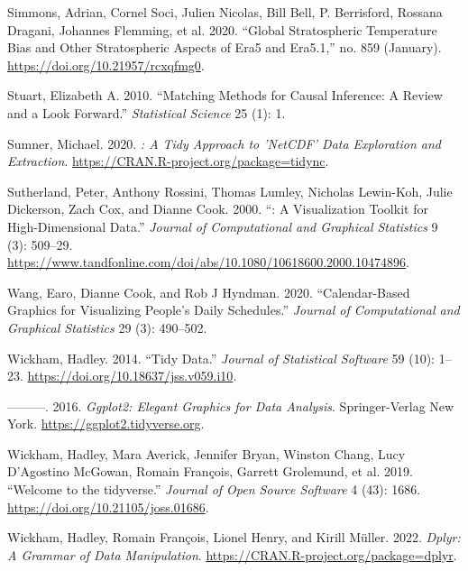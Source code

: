 \documentclass{article}
\newlength{\cslhangindent}
\newlength{\cslentryspacingunit} %
\newenvironment{CSLReferences}[2] %
 {%
  \setlength{\parindent}{0pt}
  \ifodd #1
  \let\oldpar\par
  \def\par{\hangindent=\cslhangindent\oldpar}
  \fi
  \setlength{\parskip}{#2\cslentryspacingunit}
 }%
 {}
\begin{document}
\begin{CSLReferences}{1}{0}
\leavevmode{}%
Simmons, Adrian, Cornel Soci, Julien Nicolas, Bill Bell, P. Berrisford, Rossana Dragani, Johannes Flemming, et al. 2020. {``Global Stratospheric Temperature Bias and Other Stratospheric Aspects of Era5 and Era5.1,''} no. 859 (January). \url{https://doi.org/10.21957/rcxqfmg0}.

\leavevmode{}%
Stuart, Elizabeth A. 2010. {``Matching Methods for Causal Inference: A Review and a Look Forward.''} \emph{Statistical Science} 25 (1): 1.

\leavevmode{}%
Sumner, Michael. 2020. \emph{: A Tidy Approach to 'NetCDF' Data Exploration and Extraction}. \url{https://CRAN.R-project.org/package=tidync}.

\leavevmode{}%
Sutherland, Peter, Anthony Rossini, Thomas Lumley, Nicholas Lewin-Koh, Julie Dickerson, Zach Cox, and Dianne Cook. 2000. {``: A Visualization Toolkit for High-Dimensional Data.''} \emph{Journal of Computational and Graphical Statistics} 9 (3): 509--29. \url{https://www.tandfonline.com/doi/abs/10.1080/10618600.2000.10474896}.

\leavevmode{}%
Wang, Earo, Dianne Cook, and Rob J Hyndman. 2020. {``Calendar-Based Graphics for Visualizing People's Daily Schedules.''} \emph{Journal of Computational and Graphical Statistics} 29 (3): 490--502.

\leavevmode{}%
Wickham, Hadley. 2014. {``Tidy Data.''} \emph{Journal of Statistical Software} 59 (10): 1--23. \url{https://doi.org/10.18637/jss.v059.i10}.

\leavevmode{}%
---------. 2016. \emph{Ggplot2: Elegant Graphics for Data Analysis}. Springer-Verlag New York. \url{https://ggplot2.tidyverse.org}.

\leavevmode{}%
Wickham, Hadley, Mara Averick, Jennifer Bryan, Winston Chang, Lucy D'Agostino McGowan, Romain François, Garrett Grolemund, et al. 2019. {``Welcome to the {tidyverse}.''} \emph{Journal of Open Source Software} 4 (43): 1686. \url{https://doi.org/10.21105/joss.01686}.

\leavevmode{}%
Wickham, Hadley, Romain François, Lionel Henry, and Kirill Müller. 2022. \emph{Dplyr: A Grammar of Data Manipulation}. \url{https://CRAN.R-project.org/package=dplyr}.


\end{CSLReferences}
\end{document}
